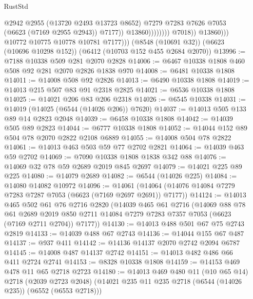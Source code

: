 \begin{lexlean}{RustStd}
\begin{coremodule}
                                        @2942
                                        @2955
                                        (@13720 @2493 @13723 @8652)
                                        @7279
                                        @7283
                                        @7626
                                        @7053
                                        (@6623 (@7169 @2955 @2943))
                                        @7177))
                                    @13860))))))))
                    @7018))
                @13860)))
          @10772
          @10775
          @10778
          @10781
          @7177)))
    (@8548 (@10691 @32))
    (@6623 (@10696 @10298 @152))
    (@6412 (@10703 @152 @455 @2684 @2070))
@13996 := @7188 @10338 @509 @281 @2070 @2828
@14006 := @6467 @10338 @1808 @460 @508 @92 @281 @2070 @2826 @1838 @970
@14008 := @6481 @10338 @1808
@14011 := @14008 @508 @92 @2826
@14013 := @6490 @10338 @1808
@14019 := @14013 @215 @507 @83 @91 @2318 @2825
@14021 := @6536 @10338 @1808
@14025 := @14021 @206 @83 @206 @2318
@14026 := @6545 @10338
@14031 := @14019 (@14025 (@6544 (@14026 @206)) @7620)
@14037 := @14013 @505 @133 @89 @14 @2823 @2048
@14039 := @6458 @10338 @1808
@14042 := @14039 @505 @89 @2823
@14044 := @6777 @10338 @1808
@14052 := @14044 @152 @89 @504 @78 @2070 @2822 @2108 @6889
@14055 := @14008 @504 @78 @2822
@14061 := @14013 @463 @503 @59 @77 @2702 @2821
@14064 := @14039 @463 @59 @2702
@14069 := @7090 @10338 @1808 @1838 @342 @88
@14076 := @14069 @32 @78 @59 @2689 @2019 @845 @2697
@14079 := @14021 @225 @89 @225
@14080 := @14079 @2689
@14082 := @6544 (@14026 @225)
@14084 := @14080 @14082 @10972
@14096 := @14061 (@14064 (@14076 @14084 @7279 @7283 @7287 @7053 (@6623 (@7169 @2697 @2691)) @7177))
@14124 := @14013
    @465
    @502
    @61
    @76
    @2716
    @2820
    (@14039
      @465
      @61
      @2716
      (@14069
        @88
        @78
        @61
        @2689
        @2019
        @850
        @2711
        @14084
        @7279
        @7283
        @7357
        @7053
        (@6623 (@7169 @2711 @2704))
        @7177))
@14130 := @14013 @488 @501 @67 @75 @2743 @2819
@14133 := @14039 @488 @67 @2743
@14136 := @14044 @155 @67 @487
@14137 := @937 @411
@14142 := @14136 @14137 @2070 @2742 @2094 @6787
@14145 := @14008 @487 @14137 @2742
@14151 := @14013 @482 @486 @66 @411 @2724 @2741
@14153 := @8328 @10338 @1808
@14159 := @14153 @469 @478 @11 @65 @2718 @2723
@14180 := @14013
    @469
    @480
    @11
    (@10 @65 @14)
    @2718
    (@2039 @2723 @2048)
    (@14021 @235 @11 @235 @2718 (@6544 (@14026 @235)) (@6552 (@6553 @2718)))

\end{coremodule}
\end{lexlean}

